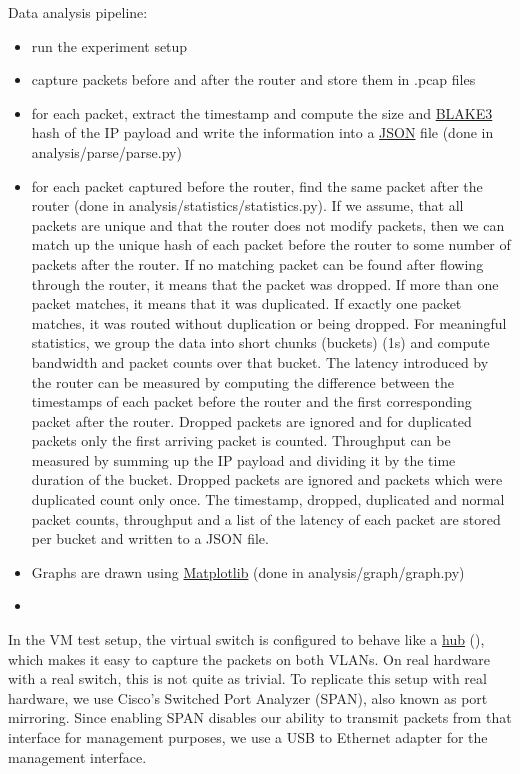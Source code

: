 Data analysis pipeline:
\begin{itemize}
  \item run the experiment setup
  \item capture packets before and after the router and store them in .pcap files
  \item for each packet, extract the timestamp and compute the size and \href{https://en.wikipedia.org/wiki/BLAKE_(hash_function)#BLAKE3}{BLAKE3} hash of the IP payload and write the information into a \href{https://en.wikipedia.org/wiki/JSON}{JSON} file (done in analysis/parse/parse.py)
  \item for each packet captured before the router, find the same packet after the router (done in analysis/statistics/statistics.py). If we assume, that all packets are unique and that the router does not modify packets, then we can match up the unique hash of each packet before the router to some number of packets after the router. If no matching packet can be found after flowing through the router, it means that the packet was dropped. If more than one packet matches, it means that it was duplicated. If exactly one packet matches, it was routed without duplication or being dropped. For meaningful statistics, we group the data into short chunks (buckets) (1s) and compute bandwidth and packet counts over that bucket. The latency introduced by the router can be measured by computing the difference between the timestamps of each packet before the router and the first corresponding packet after the router. Dropped packets are ignored and for duplicated packets only the first arriving packet is counted. Throughput can be measured by summing up the IP payload  and dividing it by the time duration of the bucket. Dropped packets are ignored and packets which were duplicated count only once. The timestamp, dropped, duplicated and normal packet counts, throughput and a list of the latency of each packet are stored per bucket and written to a JSON file.
  \item Graphs are drawn using \href{https://matplotlib.org/}{Matplotlib} (done in analysis/graph/graph.py)
  \item {}
\end{itemize}


In the VM test setup, the virtual switch is configured to behave like a \href{https://en.wikipedia.org/wiki/Ethernet_hub}{hub} (\href{https://github.com/NixOS/nixpkgs/blob/0634959ae9c75ac8cab28dfcc9a0f045cf30dfc6/nixos/lib/test-driver/test_driver/vlan.py#L43}{}), which makes it easy to capture the packets on both VLANs. On real hardware with a real switch, this is not quite as trivial. To replicate this setup with real hardware, we use Cisco's Switched Port Analyzer (SPAN), also known as port mirroring. Since enabling SPAN disables our ability to transmit packets from that interface for management purposes, we use a USB to Ethernet adapter for the management interface.
